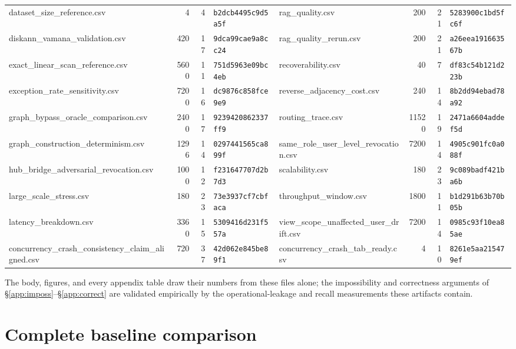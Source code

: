 \documentclass[sigconf, nonacm, review]{acmart}
\begin{document}
\begin{table}[t]
\begin{tabular}{@{}lrrl@{\hskip 1.5em}lrrl@{}}
dataset\_size\_reference.csv & 4 & 4 & \texttt{b2dcb4495c9d5a5f} & rag\_quality.csv & 200 & 21 & \texttt{5283900c1bd5fc6f} \\
diskann\_vamana\_validation.csv & 420 & 17 & \texttt{9dca99cae9a8cc24} & rag\_quality\_rerun.csv & 200 & 21 & \texttt{a26eea191663567b} \\
exact\_linear\_scan\_reference.csv & 5600 & 11 & \texttt{751d5963e09bc4eb} & recoverability.csv & 40 & 7 & \texttt{df83c54b121d223b} \\
exception\_rate\_sensitivity.csv & 7200 & 16 & \texttt{dc9876c858fce9e9} & reverse\_adjacency\_cost.csv & 240 & 14 & \texttt{8b2dd94ebad78a92} \\
graph\_bypass\_oracle\_comparison.csv & 2400 & 17 & \texttt{9239420862337ff9} & routing\_trace.csv & 11520 & 19 & \texttt{2471a6604addef5d} \\
graph\_construction\_determinism.csv & 1296 & 14 & \texttt{0297441565ca899f} & same\_role\_user\_level\_revocation.csv & 7200 & 14 & \texttt{4905c901fc0a088f} \\
hub\_bridge\_adversarial\_revocation.csv & 1000 & 12 & \texttt{f231647707d2b7d3} & scalability.csv & 180 & 23 & \texttt{9c089badf421ba6b} \\
large\_scale\_stress.csv & 180 & 23 & \texttt{73e3937cf7cbfaca} & throughput\_window.csv & 1800 & 11 & \texttt{b1d291b63b70b05b} \\
latency\_breakdown.csv & 3360 & 15 & \texttt{5309416d231f557a} & view\_scope\_unaffected\_user\_drift.csv & 7200 & 14 & \texttt{0985c93f10ea85ae} \\
concurrency\_crash\_consistency\_claim\_aligned.csv & 720 & 37 & \texttt{42d062e845be89f1} & concurrency\_crash\_tab\_ready.csv & 4 & 10 & \texttt{8261e5aa215479ef} \\
\bottomrule
\end{tabular}
\end{table}

The body, figures, and every appendix table draw their numbers from these
files alone; the impossibility and correctness arguments of
\S\ref{app:imposs}--\S\ref{app:correct} are validated empirically by the
operational-leakage and recall measurements these artifacts contain.


\section{Complete baseline comparison}
\label{app:baseline}
\end{document}

